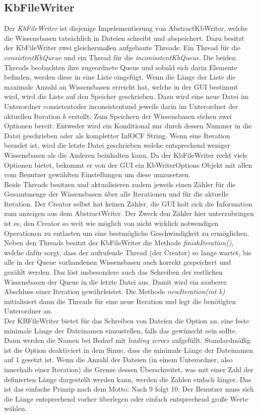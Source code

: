 \documentclass[12pt,a4paper]{article}
\begin{document}
\subsection{KbFileWriter}
\label{sec:kbfilewriter}
Der \textit{KbFileWriter} ist diejenige Impelementierung von AbstractKbWriter, welche die Wissensbasen tatsächlich in Dateien schreibt und abspeichert. Dazu besitzt der KbFileWriter zwei gleichermaßen aufgebaute Threads: Ein Thread für die \textit{consistentKbQueue} und ein Thread für die \textit{inconisstentKbQueue}. Die beiden Threads beobachten ihre zugeordnete Queue und sobald sich darin Elemente befinden, werden diese in eine Liste eingefügt. Wenn die Länge der Liste die maximale Anzahl an Wissensbasen erreicht hat, welche in der GUI bestimmt wird, wird die Liste auf den Speicher geschrieben. Dazu wird eine neue  Datei im Unterordner \glqq consistent\grqq \space oder \glqq inconsistent\grqq \space  und jeweils darin im Unterordnet der aktuellen Iteration $k$ erstellt. Zum Speichern der Wissensbasen stehen zwei Optionen bereit: Entweder wird ein Konditional nur durch dessen Nummer in die Datei geschrieben oder als kompletter InfOCF String. Wenn eine Iteration beendet ist, wird die letzte Datei geschrieben welche entsprechend weniger Wissensbasen als die Anderen beinhalten kann. Da der KbFileWriter recht viele Optionen bietet, bekommt er von der GUI ein KbWriterOptions Objekt mit allen vom Benutzer gewählten Einstellungen um diese umzusetzen.\\
Beide Threads besitzen und aktualisieren zudem jeweils einen Zähler für die Gesamtmenge der Wissensbasen über alle Iterationen und für die aktuelle Iteration. Der Creator selbst hat keinen Zähler, die GUI holt sich die Information zum anzeigen aus dem AbstractWriter. Der Zweck den Zähler hier unterzubringen ist es, den Creator so weit wie möglich von nicht wirklich notwendigen Operationen zu entlasten um eine bestmögliche Geschwindigkeit zu ermöglichen.\\
Neben den Threads besitzt der KbFileWriter die Methode \textit{finishIteration()}, welche dafür sorgt, dass der aufrufende Thread (der Creator) so lange wartet, bis alle in der Queue vorhandenen Wissensbasen auch korrekt gespeichert und gezählt werden. Das löst insbesondere auch das Schreiben der restlichen Wissensbasen der Queue in die letzte Datei aus. Damit wird ein sauberer Abschluss einer Iteration gewährleistet. Die Methode \textit{newIteration(int k)} initialisiert dann die Threads für eine neue Iteration und legt die benötigten Unterordner an. \\
Der KBFileWriter bietet für das Schreiben von Dateien die Option an, eine feste minimale Länge der Dateinamen einzustellen, falls das gewünscht sein sollte. Dann werden die Namen bei Bedarf mit \textit{leading zeroes} aufgefüllt. Standardmäßig ist die Option deaktiviert in dem Sinne, dass die minimale Länge der Dateinamen auf 1 gesetzt ist. Wenn die Anzahl der Dateien (in einem Unterordner, also innerhalb einer Iteration) die Grenze dessen Überschreitet, was mit einer Zahl der definierten Länge dargestellt werden kann, werden die Zahlen einfach länger. Das ist das einfache Prinzip nach dem Motto: Nach 9 folgt 10. Der Benutzer muss sich die Länge entsprechend vorher überlegen oder einfach entsprechend große Werte wählen. 
\end{document}
